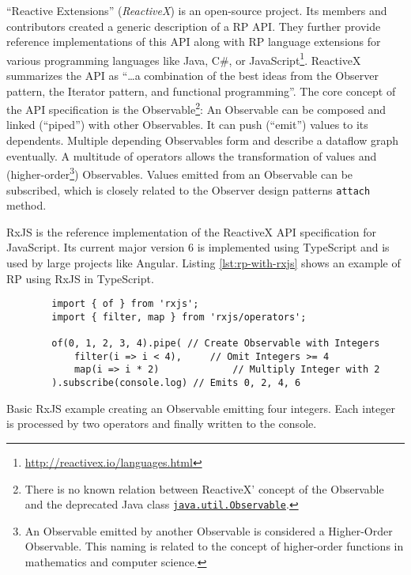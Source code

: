 \documentclass[12pt,a4paper]{article}
\begin{document}
``Reactive Extensions'' (\emph{ReactiveX}) is an open-source project. Its members and contributors created a generic description of a RP API. They further provide reference implementations of this API along with RP language extensions for various programming languages like Java, C\#, or JavaScript\footnote{\url{http://reactivex.io/languages.html}}. ReactiveX summarizes the API as ``\dots a combination of the best ideas from the Observer pattern, the Iterator pattern, and functional programming''\cite{reactivex}. The core concept of the API specification is the Observable\footnote{There is no known relation between ReactiveX' concept of the Observable and the deprecated Java class \href{https://docs.oracle.com/en/java/javase/11/docs/api/java.base/java/util/Observable.html}{\texttt{java.util.Observable}}.}: An Observable can be composed and linked (``piped'') with other Observables. It can push (``emit'') values to its dependents. Multiple depending Observables form and describe a dataflow graph eventually. A multitude of operators allows the transformation of values and (higher-order\footnote{An Observable emitted by another Observable is considered a Higher-Order Observable. This naming is related to the concept of higher-order functions in mathematics and computer science.}) Observables. Values emitted from an Observable can be subscribed, which is closely related to the Observer design patterns \texttt{attach} method.

RxJS\cite{rxjs} is the reference implementation of the ReactiveX API specification for JavaScript. Its current major version 6 is implemented using TypeScript and is used by large projects like Angular\cite{angualrrxjs}. Listing \ref{lst:rp-with-rxjs} shows an example of RP using RxJS in TypeScript.

\begin{listing}[H]
	\begin{verbatim}
		import { of } from 'rxjs';
		import { filter, map } from 'rxjs/operators';

		of(0, 1, 2, 3, 4).pipe(	// Create Observable with Integers
			filter(i => i < 4),		// Omit Integers >= 4
			map(i => i * 2)				// Multiply Integer with 2
		).subscribe(console.log) // Emits 0, 2, 4, 6
	\end{verbatim}
	\caption{Basic RxJS example creating an Observable emitting four integers. Each integer is processed by two operators and finally written to the console.}
	\label{lst:rp-with-rxjs}
\end{listing}
\end{document}
